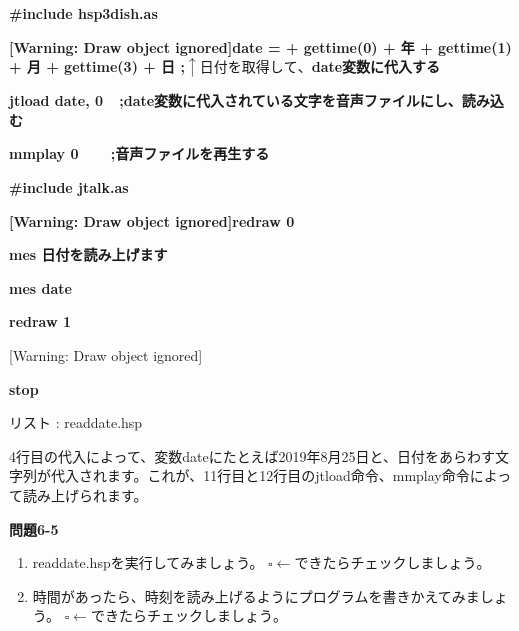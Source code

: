 \documentclass[a4paper,dvipdfmx]{jarticle}
\newcommand\liststyleLix{%
\renewcommand\theenumi{\arabic{enumi}}
\renewcommand\theenumii{\arabic{enumii}}
\renewcommand\theenumiii{\arabic{enumiii}}
\renewcommand\theenumiv{\arabic{enumiv}}
\renewcommand\labelenumi{\theenumi.}
\renewcommand\labelenumii{\theenumii.}
\renewcommand\labelenumiii{\theenumiii.}
\renewcommand\labelenumiv{\theenumiv.}
}
\newcounter{List}
\renewcommand\theList{\arabic{List}}
\begin{document}
\centering
\begin{minipage}{17.006cm}
{\ttfamily\bfseries
\#include {\textquotedbl}hsp3dish.as{\textquotedbl}}

\begin{minipage}{17.006cm}
{\ttfamily\bfseries
[Warning: Draw object ignored]date = {\textquotedbl}{\textquotedbl} + gettime(0) + {\textquotedbl}年{\textquotedbl}
+ gettime(1) + {\textquotedbl}月{\textquotedbl} + gettime(3) + {\textquotedbl}日{\textquotedbl}\newline
\textcolor[rgb]{0.0,0.0,0.6}{;$\uparrow
日付を取得して、$date変数に代入する}}
\end{minipage}\begin{minipage}{17.006cm}
{\ttfamily\bfseries
jtload date,
0\ \ \textcolor[rgb]{0.0,0.0,0.6}{;date変数に代入されている文字を音声ファイルにし、読み込む}}

{\ttfamily\bfseries
mmplay
0\ \ \ \ \textcolor[rgb]{0.0,0.0,0.6}{;音声ファイルを再生する}}
\end{minipage}{\ttfamily\bfseries
\#include {\textquotedbl}jtalk.as{\textquotedbl}}

{\ttfamily\bfseries
[Warning: Draw object ignored]redraw 0}

{\ttfamily\bfseries
mes {\textquotedbl}日付を読み上げます{\textquotedbl}}

{\ttfamily\bfseries
mes date}

{\ttfamily\bfseries
redraw 1}

[Warning: Draw object ignored]

{\ttfamily\bfseries
stop}

{\upshape
リスト \stepcounter{List}{\theList}: readdate.hsp}
\end{minipage}
{
4行目の代入によって、変数dateにたとえば2019年8月25日と、日付をあらわす文字列が代入されます。これが、11行目と12行目のjtload命令、mmplay命令によって読み上げられます。}

{\bfseries
問題6-5}

\liststyleLix
\begin{enumerate}
\item {
readdate.hspを実行してみましょう。\newline
${\square}\leftarrow
できたらチェックしましょう。$}
\item {
時間があったら、時刻を読み上げるようにプログラムを書きかえてみましょう。\newline
${\square}\leftarrow
できたらチェックしましょう。$}
\end{enumerate}
\end{document}
